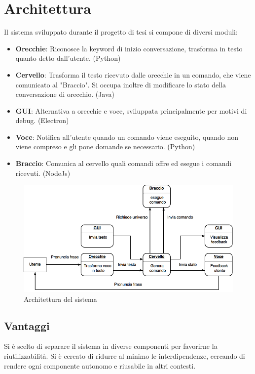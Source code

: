 \documentclass[twoside]{supsistudent}
\begin{document}
\chapter{Architettura}

Il sistema sviluppato durante il progetto di tesi si compone di diversi moduli:
\begin{itemize}
	\item \textbf{Orecchie}: Riconosce la keyword di inizio conversazione, trasforma in testo quanto detto dall'utente. (Python)
	\item \textbf{Cervello}: Trasforma il testo ricevuto dalle orecchie in un comando, che viene comunicato al "Braccio". Si occupa inoltre di modificare lo stato della conversazione di orecchio. (Java)
	\item \textbf{GUI}: Alternativa a orecchie e voce, sviluppata principalmente per motivi di debug. (Electron)
	\item \textbf{Voce}: Notifica all'utente quando un comando viene eseguito, quando non viene compreso e gli pone domande se necessario. (Python)
	\item \textbf{Braccio}: Comunica al cervello quali comandi offre ed esegue i comandi ricevuti. (NodeJs)
\end{itemize}
\begin{figure}[H]
\centering
\includegraphics[width=\textwidth]{Architettura}
\caption{Architettura del sistema}
\label{fig:pose}
\end{figure}
\section{Vantaggi}
Si è scelto di separare il sistema in diverse componenti per favorirne la riutilizzabilità. Si è cercato di ridurre al minimo le interdipendenze, cercando di rendere ogni componente autonomo e riusabile in altri contesti.
\end{document}
